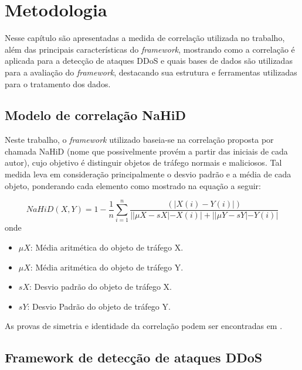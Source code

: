 \chapter[Metodologia]{Metodologia}
\label{metodologia}
Nesse capítulo são apresentadas a medida de correlação utilizada no trabalho, além das principais características do \textit{framework}, mostrando como a correlação é aplicada
para a detecção de ataques DDoS e quais bases de dados são utilizadas para a avaliação do \textit{framework}, destacando sua estrutura e ferramentas utilizadas para o tratamento dos dados.

\section{Modelo de correlação NaHiD}

Neste trabalho, o \textit{framework} utilizado baseia-se na correlação proposta por \cite{HOQUE201748} chamada NaHiD (nome que possivelmente provém a partir das iniciais de cada autor), cujo objetivo é distinguir objetos de tráfego normais e maliciosos. Tal medida leva em consideração principalmente o desvio padrão e a média de cada objeto, ponderando cada elemento como mostrado na equação a seguir:  

\begin{equation}
	NaHiD(X,Y) = 1 - \frac{1}{n} \sum_{i=1}^{n} \frac{\left(|X(i) -	 Y(i)|\right)}{||\mu{X} - sX| - X(i)| + ||\mu{Y} - sY| - Y(i)|}
\end{equation}
onde
\begin{itemize}
	\item $\mu{X}$: Média aritmética do objeto de tráfego X.
 	\item $\mu{X}$: Média aritmética do objeto de tráfego Y.
	\item $sX$: Desvio padrão do objeto de tráfego X.
	\item $sY$: Desvio Padrão do objeto de tráfego Y.
\end{itemize}
As provas de simetria e identidade da correlação podem ser encontradas em \cite{HOQUE201748}.

\section{Framework de detecção de ataques DDoS}
 
